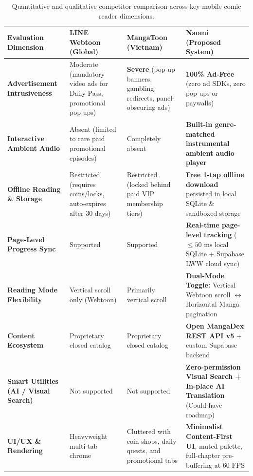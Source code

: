 \begin{table}[H]
\centering
\caption{Quantitative and qualitative competitor comparison across key mobile comic reader dimensions.}
\label{tab:competitors}
\footnotesize
\renewcommand{\arraystretch}{1.25}
\begin{tabularx}{\textwidth}{L{3.5cm} L{3.6cm} L{3.6cm} Y}
\toprule
{}
\textbf{Evaluation Dimension} & \textbf{LINE Webtoon (Global)} & \textbf{MangaToon (Vietnam)} & \textbf{Naomi (Proposed System)} \\
\midrule
\textbf{Advertisement Intrusiveness} & Moderate (mandatory video ads for Daily Pass, promotional pop-ups) & \textbf{Severe} (pop-up banners, gambling redirects, panel-obscuring ads) & \textbf{100\% Ad-Free} (zero ad SDKs, zero pop-ups or paywalls) \\
\textbf{Interactive Ambient Audio} & Absent (limited to rare paid promotional episodes) & Completely absent & \textbf{Built-in genre-matched instrumental ambient audio player} \\
\textbf{Offline Reading \& Storage} & Restricted (requires coins/locks, auto-expires after 30 days) & Restricted (locked behind paid VIP membership tiers) & \textbf{Free 1-tap offline download} persisted in local SQLite \& sandboxed storage \\
\textbf{Page-Level Progress Sync} & Supported & Supported & \textbf{Real-time page-level tracking} ($\le 50\text{ ms}$ local SQLite + Supabase LWW cloud sync) \\
\textbf{Reading Mode Flexibility} & Vertical scroll only (Webtoon) & Primarily vertical scroll & \textbf{Dual-Mode Toggle:} Vertical Webtoon scroll $\leftrightarrow$ Horizontal Manga pagination \\
\textbf{Content Ecosystem} & Proprietary closed catalog & Proprietary closed catalog & \textbf{Open MangaDex REST API v5} + custom Supabase backend \\
\textbf{Smart Utilities (AI / Visual Search)} & Not supported & Not supported & \textbf{Zero-permission Visual Search + In-place AI Translation} (Could-have roadmap) \\
\textbf{UI/UX \& Rendering} & Heavyweight multi-tab chrome & Cluttered with coin shops, daily quests, and promotional tabs & \textbf{Minimalist Content-First UI}, muted palette, full-chapter pre-buffering at $60\text{ FPS}$ \\
\bottomrule
\end{tabularx}
\end{table}

